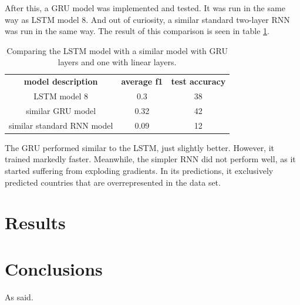 \documentclass[runningheads]{llncs}
\begin{document}
After this, a GRU model was implemented and tested. It was run in the same way as LSTM model 8. And out of curiosity, a similar standard two-layer RNN was run in the same way. The result of this comparison is seen in table \ref{tab:GRU_LSTM_RNN_comp}.


\begin{table}[h!]
    \begin{center}
        \caption{Comparing the LSTM model with a similar model with GRU layers and one with linear layers.}
        \label{tab:GRU_LSTM_RNN_comp}
		\begin{tabularx}{.8\textwidth}{ | c | c | c |}
			\textbf{model description} & \textbf{average f1} & \textbf{test accuracy} \\
			LSTM model 8 & 0.3 & 38 \\
			similar GRU model & 0.32  & 42 \\
			similar standard RNN model & 0.09 & 12 \\
		\end{tabularx}  
    \end{center}
\end{table}

The GRU performed similar to the LSTM, just slightly better. However, it trained markedly faster. Meanwhile, the simpler RNN did not perform well, as it started suffering from exploding gradients. In its predictions, it exclusively predicted countries that are overrepresented in the data set. 

\section{Results}
\section{Conclusions}


As \cite{Alpher04} said.







\end{document}
